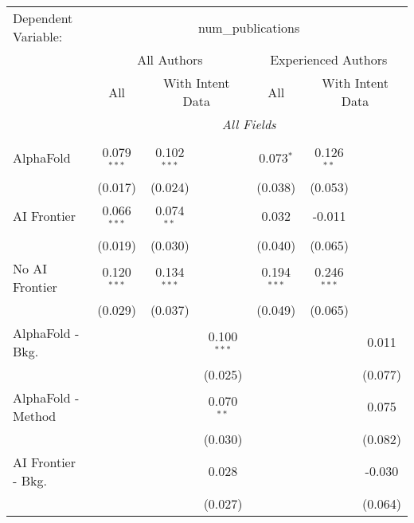 \begingroup
\centering
\begin{tabular}{lcccccc}
   \tabularnewline \midrule \midrule
   Dependent Variable: & \multicolumn{6}{c}{num\_publications}\\
 & \multicolumn{3}{c}{All Authors} & \multicolumn{3}{c}{Experienced Authors} \\
\cmidrule(lr){2-4} \cmidrule(lr){5-7}
 & \multicolumn{1}{c}{All} & \multicolumn{2}{c}{With Intent Data} & \multicolumn{1}{c}{All} & \multicolumn{2}{c}{With Intent Data} \\
\cmidrule(lr){2-2} \cmidrule(lr){3-4} \cmidrule(lr){5-5} \cmidrule(lr){6-7}
 & \multicolumn{6}{c}{\textit{All Fields}} \\ \\
   AlphaFold               & 0.079$^{***}$ & 0.102$^{***}$ &               & 0.073$^{*}$   & 0.126$^{**}$  &   \\   
                           & (0.017)       & (0.024)       &               & (0.038)       & (0.053)       &   \\   
   AI Frontier             & 0.066$^{***}$ & 0.074$^{**}$  &               & 0.032         & -0.011        &   \\   
                           & (0.019)       & (0.030)       &               & (0.040)       & (0.065)       &   \\   
   No AI Frontier          & 0.120$^{***}$ & 0.134$^{***}$ &               & 0.194$^{***}$ & 0.246$^{***}$ &   \\   
                           & (0.029)       & (0.037)       &               & (0.049)       & (0.065)       &   \\   
   AlphaFold - Bkg.        &               &               & 0.100$^{***}$ &               &               & 0.011\\   
                           &               &               & (0.025)       &               &               & (0.077)\\   
   AlphaFold - Method      &               &               & 0.070$^{**}$  &               &               & 0.075\\   
                           &               &               & (0.030)       &               &               & (0.082)\\   
   AI Frontier - Bkg.      &               &               & 0.028         &               &               & -0.030\\   
                           &               &               & (0.027)       &               &               & (0.064)\\   

\end{tabular}
